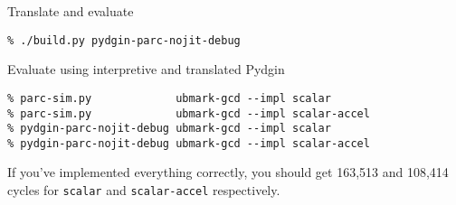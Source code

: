 \begin{task}
\begin{frame}[fragile]{Translate and evaluate}

\begin{Verbatim}[commandchars=\\\{\}]
% cd \midtilde/pydgin-tut/scripts
% ./build.py pydgin-parc-nojit-debug
\end{Verbatim}

Evaluate using interpretive and translated Pydgin

\begin{Verbatim}[commandchars=\\\{\}]
% cd \midtilde/pydgin-tut/bmarks/build
% parc-sim.py             ubmark-gcd --impl scalar
% parc-sim.py             ubmark-gcd --impl scalar-accel
% pydgin-parc-nojit-debug ubmark-gcd --impl scalar
% pydgin-parc-nojit-debug ubmark-gcd --impl scalar-accel
\end{Verbatim}

If you've implemented everything correctly, you should get 163,513 and
108,414 cycles for \texttt{scalar} and \texttt{scalar-accel} respectively.

\end{frame}
\end{task}

